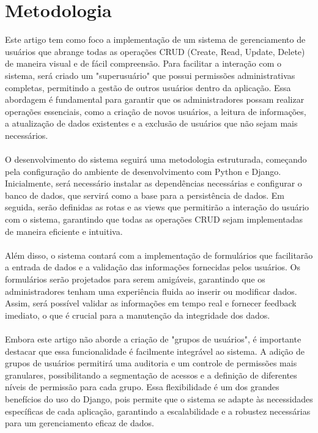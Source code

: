 \documentclass[11pt]{article} %
\begin{document}
\section{Metodologia}
Este artigo tem como foco a implementação de um sistema de gerenciamento de usuários que abrange todas as operações CRUD (Create, Read, Update, Delete) de maneira visual e de fácil compreensão. Para facilitar a interação com o sistema, será criado um "superusuário" que possui permissões administrativas completas, permitindo a gestão de outros usuários dentro da aplicação. Essa abordagem é fundamental para garantir que os administradores possam realizar operações essenciais, como a criação de novos usuários, a leitura de informações, a atualização de dados existentes e a exclusão de usuários que não sejam mais necessários. 
\\\\
O desenvolvimento do sistema seguirá uma metodologia estruturada, começando pela configuração do ambiente de desenvolvimento com Python e Django. Inicialmente, será necessário instalar as dependências necessárias e configurar o banco de dados, que servirá como a base para a persistência de dados. Em seguida, serão definidas as rotas e as views que permitirão a interação do usuário com o sistema, garantindo que todas as operações CRUD sejam implementadas de maneira eficiente e intuitiva.
 \\\\
Além disso, o sistema contará com a implementação de formulários que facilitarão a entrada de dados e a validação das informações fornecidas pelos usuários. Os formulários serão projetados para serem amigáveis, garantindo que os administradores tenham uma experiência fluida ao inserir ou modificar dados. Assim, será possível validar as informações em tempo real e fornecer feedback imediato, o que é crucial para a manutenção da integridade dos dados. 
\\\\
Embora este artigo não aborde a criação de "grupos de usuários", é importante destacar que essa funcionalidade é facilmente integrável ao sistema. A adição de grupos de usuários permitirá uma auditoria e um controle de permissões mais granulares, possibilitando a segmentação de acessos e a definição de diferentes níveis de permissão para cada grupo. Essa flexibilidade é um dos grandes benefícios do uso do Django, pois permite que o sistema se adapte às necessidades específicas de cada aplicação, garantindo a escalabilidade e a robustez necessárias para um gerenciamento eficaz de dados.
\end{document}
